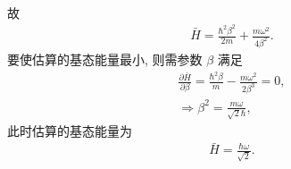 \documentclass{assignment}
\begin{document}
\begin{sol}
\begin{align}
    \end{align}
    故
    \begin{align}
        \bar{H}=\frac{\hbar^2\beta^2}{2m}+\frac{m\omega^2}{4\beta^2}.
    \end{align}
    要使估算的基态能量最小, 则需参数 $\beta$ 满足
    \begin{gather}
        \frac{\partial\bar{H}}{\partial\beta}=\frac{\hbar^2\beta}{m}-\frac{m\omega^2}{2\beta^3}=0,\\
        \Longrightarrow\beta^2=\frac{m\omega}{\sqrt{2}\hbar},
    \end{gather}
    此时估算的基态能量为
    \begin{align}
        \bar{H}=\frac{\hbar\omega}{\sqrt{2}}.
    \end{align}
\end{sol}
\end{document}
